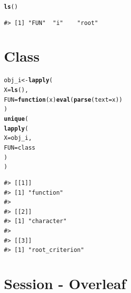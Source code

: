 \documentclass{article}\usepackage[]{graphicx}\usepackage[]{color}
\makeatletter
\newcommand{\hlstd}[1]{\textcolor[rgb]{0.345,0.345,0.345}{#1}}%
\newcommand{\hlkwa}[1]{\textcolor[rgb]{0.161,0.373,0.58}{\textbf{#1}}}%
\newcommand{\hlkwb}[1]{\textcolor[rgb]{0.69,0.353,0.396}{#1}}%
\newcommand{\hlkwc}[1]{\textcolor[rgb]{0.333,0.667,0.333}{#1}}%
\newcommand{\hlkwd}[1]{\textcolor[rgb]{0.737,0.353,0.396}{\textbf{#1}}}%
\newenvironment{kframe}{%
 \def\at@end@of@kframe{}%
 \ifinner\ifhmode%
  \def\at@end@of@kframe{\end{minipage}}%
  \begin{minipage}{\columnwidth}%
 \fi\fi%
 \def\FrameCommand##1{\hskip\@totalleftmargin \hskip-\fboxsep
 \colorbox{shadecolor}{##1}\hskip-\fboxsep
     \hskip-\linewidth \hskip-\@totalleftmargin \hskip\columnwidth}%
 \MakeFramed {\advance\hsize-\width
   \@totalleftmargin\z@ \linewidth\hsize
   \@setminipage}}%
 {\par\unskip\endMakeFramed%
 \at@end@of@kframe}
\newenvironment{knitrout}{}{} %
\makeatother
\begin{document}
\begin{knitrout}
\color{fgcolor}\begin{kframe}
\begin{alltt}
\hlkwd{ls}\hlstd{()}
\end{alltt}
\begin{verbatim}
#> [1] "FUN"  "i"    "root"
\end{verbatim}
\end{kframe}
\end{knitrout}

\section*{Class}

\begin{knitrout}
\color{fgcolor}\begin{kframe}
\begin{alltt}
\hlstd{obj_i} \hlkwb{<-} \hlkwd{lapply}\hlstd{(}
  \hlkwc{X} \hlstd{=} \hlkwd{ls}\hlstd{(),}
  \hlkwc{FUN} \hlstd{=} \hlkwa{function}\hlstd{(}\hlkwc{x}\hlstd{)} \hlkwd{eval}\hlstd{(}\hlkwd{parse}\hlstd{(}\hlkwc{text} \hlstd{= x))}
\hlstd{)}
\hlkwd{unique}\hlstd{(}
  \hlkwd{lapply}\hlstd{(}
    \hlkwc{X} \hlstd{= obj_i,}
    \hlkwc{FUN} \hlstd{= class}
  \hlstd{)}
\hlstd{)}
\end{alltt}
\begin{verbatim}
#> [[1]]
#> [1] "function"
#> 
#> [[2]]
#> [1] "character"
#> 
#> [[3]]
#> [1] "root_criterion"
\end{verbatim}
\end{kframe}
\end{knitrout}

\newpage

\section*{Session - Overleaf}
\end{document}
